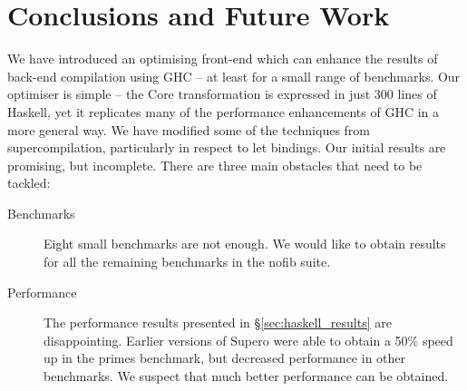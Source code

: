 \documentclass{llncs}
\begin{document}
\begin{comment}
\paragraph{GRIN} The GRIN approach \cite{grin} is currently being implemented in the jhc compiler \cite{jhc}, with promising initial results. GRIN works by first translating to a monadic intermediate language, then repeatedly performing a series of optimisations, using whole program transformation. The intermediate language is at a much lower level than our Core language, so jhc is able to perform detailed optimisations that we are unable to express.

\paragraph{Other Transformations} One of the central operations within our optimisation in inlining, a technique that has been used extensively within GHC \cite{spj:inlining}. We generalise the constructor specialisation technique \cite{spj:specconstr}, by allowing specialisation on any arbitrary expression, including constructors.

One optimisation we do not currently support is the use of user provided transformation rules \cite{spj:rules}, which can be used to automatically replace certain expressions with others -- for example |sort . nub| removes duplicates then sorts a list, but can be done asymptotically faster in a single operation.
\end{comment}

\section{Conclusions and Future Work}
\label{sec:conclusion}

We have introduced an optimising front-end which can enhance the results of back-end compilation using GHC -- at least for a small range of benchmarks. Our optimiser is simple -- the Core transformation is expressed in just 300 lines of Haskell, yet it replicates many of the performance enhancements of GHC in a more general way. We have modified some of the techniques from supercompilation, particularly in respect to let bindings. Our initial results are promising, but incomplete. There are three main obstacles that need to be tackled:

\begin{description}
\item[Benchmarks] Eight small benchmarks are not enough. We would like to obtain results for all the remaining benchmarks in the nofib suite.
\item[Performance] The performance results presented in \S\ref{sec:haskell_results} are disappointing. Earlier versions of Supero were able to obtain a 50\% speed up in the primes benchmark, but decreased performance in other benchmarks. We suspect that much better performance can be obtained.
\end{description}
\end{document}
